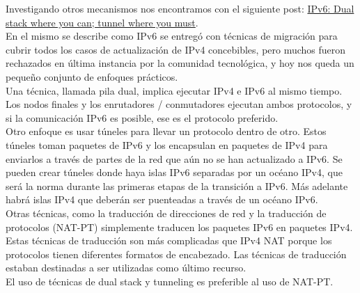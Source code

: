 \documentclass[osajnl,twocolumn,showpacs,superscriptaddress,10pt]{revtex4-1} %
\begin{document}
\begin{enumerate}[a)]
    Investigando otros mecanismos nos encontramos con el siguiente post: 
    \href{https://www.networkworld.com/article/2285078/tech-primers/ipv6--dual-stack-where-you-can--tunnel-where-you-must.html}{IPv6: Dual stack where you can; tunnel where you must}. \\

    En el mismo se describe como IPv6 se entregó con técnicas de migración para cubrir todos los casos de actualización de IPv4 
    concebibles, pero muchos fueron rechazados en última instancia por la comunidad tecnológica, y hoy nos queda un pequeño 
    conjunto de enfoques prácticos. \\

    Una técnica, llamada pila dual, implica ejecutar IPv4 e IPv6 al mismo tiempo. Los nodos finales y los enrutadores / conmutadores 
    ejecutan ambos protocolos, y si la comunicación IPv6 es posible, ese es el protocolo preferido. \\

    Otro enfoque es usar túneles para llevar un protocolo dentro de otro. Estos túneles toman paquetes de 
    IPv6 y los encapsulan en paquetes de IPv4 para enviarlos a través de partes de la red que aún no se han actualizado a IPv6. 
    Se pueden crear túneles donde haya islas IPv6 separadas por un océano IPv4, que será la norma durante las primeras 
    etapas de la transición a IPv6. Más adelante habrá islas IPv4 que deberán ser puenteadas a través de un océano IPv6. \\

    Otras técnicas, como la traducción de direcciones de red y la traducción de protocolos (NAT-PT) simplemente traducen los 
    paquetes IPv6 en paquetes IPv4. Estas técnicas de traducción son más complicadas que IPv4 NAT porque los protocolos tienen 
    diferentes formatos de encabezado. Las técnicas de traducción estaban destinadas a ser utilizadas como último recurso. \\

    El uso de técnicas de dual stack y tunneling es preferible al uso de NAT-PT.

\end{enumerate}
\end{document}
